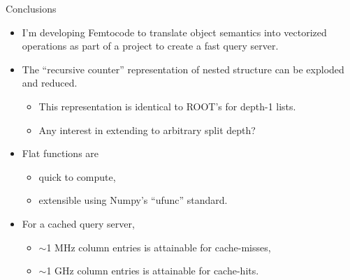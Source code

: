 \documentclass{beamer}
\begin{document}
\begin{frame}{Conclusions}
\vspace{0.3 cm}
\begin{itemize}\setlength{\itemsep}{0.5 cm}
\item I'm developing Femtocode to translate object semantics into vectorized operations as part of a project to create a fast query server.
\item The ``recursive counter'' representation of nested structure can be exploded and reduced.
\begin{itemize}
\item This representation is identical to ROOT's for depth-1 lists.
\item Any interest in extending to arbitrary split depth?
\end{itemize}
\item Flat functions are
\begin{itemize}
\item quick to compute,
\item extensible using Numpy's ``ufunc'' standard.
\end{itemize}
\item For a cached query server,
\begin{itemize}
\item $\sim$1 MHz column entries is attainable for cache-misses,
\item $\sim$1 GHz column entries is attainable for cache-hits.
\end{itemize}
\end{itemize}
\end{frame}
\end{document}
